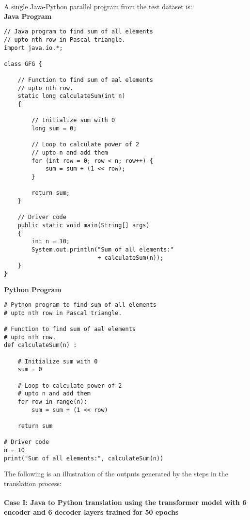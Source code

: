 A single Java-Python parallel program from the test dataset is:\\
\textbf{Java Program}\\
\vspace*{-\baselineskip}
\begin{Verbatim}[frame=single]
// Java program to find sum of all elements 
// upto nth row in Pascal triangle. 
import java.io.*; 
  
class GFG { 
  
    // Function to find sum of aal elements 
    // upto nth row. 
    static long calculateSum(int n) 
    { 
  
        // Initialize sum with 0 
        long sum = 0; 
  
        // Loop to calculate power of 2 
        // upto n and add them 
        for (int row = 0; row < n; row++) { 
            sum = sum + (1 << row); 
        } 
  
        return sum; 
    } 
  
    // Driver code 
    public static void main(String[] args) 
    { 
        int n = 10; 
        System.out.println("Sum of all elements:"
                           + calculateSum(n)); 
    } 
}  
\end{Verbatim}
\textbf{Python Program}\\
\vspace*{-\baselineskip}
\begin{Verbatim}[frame=single]
# Python program to find sum of all elements 
# upto nth row in Pascal triangle. 
  
# Function to find sum of aal elements 
# upto nth row. 
def calculateSum(n) : 
          
    # Initialize sum with 0 
    sum = 0
      
    # Loop to calculate power of 2 
    # upto n and add them 
    for row in range(n): 
        sum = sum + (1 << row) 
  
    return sum
      
# Driver code     
n = 10
print("Sum of all elements:", calculateSum(n)) 
\end{Verbatim}
\newpage
The following is an illustration of the outputs generated by the steps in the translation process: \\\\
\textbf{Case I: Java to Python translation using the transformer model with 6 encoder and 6 decoder layers trained for 50 epochs } 
